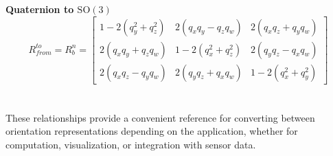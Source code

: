 \textbf{Quaternion to $\mathrm{SO}(3)$}
$$
    R_{from}^{to} = R_{b}^{n} =
    \begin{bmatrix}
        1 - 2(q_y^2 + q_z^2) & 2(q_x q_y - q_z q_w) & 2(q_x q_z + q_y q_w) \\
        2(q_x q_y + q_z q_w) & 1 - 2(q_x^2 + q_z^2) & 2(q_y q_z - q_x q_w) \\
        2(q_x q_z - q_y q_w) & 2(q_y q_z + q_x q_w) & 1 - 2(q_x^2 + q_y^2)
    \end{bmatrix}
$$
\\ \\
\noindent
These relationships provide a convenient reference for converting between orientation representations depending on the application, whether for computation, visualization, or integration with sensor data.
